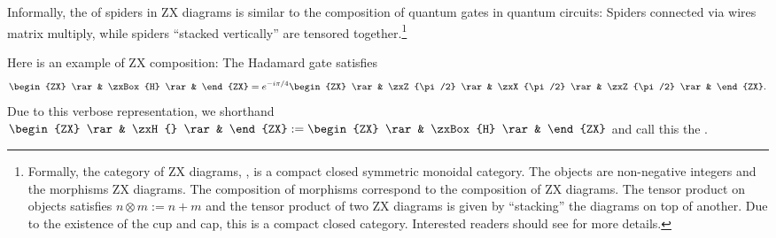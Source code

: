\begin{definition}
\label{def:zx-composition}
Informally, the  of spiders in ZX diagrams is similar to the composition of quantum gates in quantum circuits: Spiders connected via wires matrix multiply, while spiders ``stacked vertically'' are tensored together.\footnote{Formally, the category of ZX diagrams, , is a compact closed symmetric monoidal category. The objects are non-negative integers and the morphisms ZX diagrams. The composition of morphisms correspond to the composition of ZX diagrams. The tensor product on objects satisfies $n \otimes m := n + m$ and the tensor product of two ZX diagrams is given by ``stacking'' the diagrams on top of another. Due to the existence of the cup and cap, this is a compact closed category. Interested readers should see \cite{zx-category} for more details.}
\end{definition}

\begin{definition}
Here is an example of ZX composition: The Hadamard gate satisfies
\begin{align}
    \begin{ZX}
        \rar & \zxBox{H} \rar &
    \end{ZX}
    = e^{-i\pi/4} \begin{ZX}
        \rar & \zxZ{\pi/2} \rar & \zxX{\pi/2} \rar & \zxZ{\pi/2} \rar &
    \end{ZX}.
\end{align}
Due to this verbose representation, we shorthand $\begin{ZX}
    \rar & \zxH{} \rar &
\end{ZX} := \begin{ZX}
    \rar & \zxBox{H} \rar &
\end{ZX}$ and call this the .
\end{definition}

